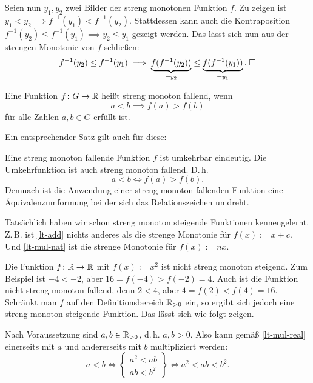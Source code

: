 Seien nun $y_1,y_2$ zwei Bilder der streng monotonen Funktion $f$.
Zu zeigen ist $y_1<y_2\implies f^{-1}(y_1)<f^{-1}(y_2)$.
Stattdessen kann auch die Kontraposition
$f^{-1}(y_2)\le f^{-1}(y_1)\implies y_2\le y_1$ gezeigt werden.
Das lässt sich nun aus der strengen Monotonie von $f$ schließen:
\begin{equation}
f^{-1}(y_2)\le f^{-1}(y_1)\implies
\underbrace{f(f^{-1}(y_2))}_{=y_2}\le \underbrace{f(f^{-1}(y_1))}_{=y_1}.\;\Box
\end{equation}

\begin{Definition}
Eine Funktion $f\colon G\to\mathbb R$ heißt streng monoton fallend, wenn
\[a<b\implies f(a)>f(b)\]
für alle Zahlen $a,b\in G$ erfüllt ist.
\end{Definition}

\noindent
Ein entsprechender Satz gilt auch für diese:
\begin{Satz}
Eine streng monoton fallende Funktion $f$ ist umkehrbar eindeutig.
Die Umkehrfunktion ist auch streng monoton fallend. D.\,h.
\[a<b\iff f(a)>f(b).\]
Demnach ist die Anwendung einer streng monoton fallenden
Funktion eine Äquivalenzumformung bei der sich das Relationszeichen
umdreht.
\end{Satz}

\noindent
Tatsächlich haben wir schon streng monoton steigende Funktionen
kennengelernt. Z.\,B. ist \eqref{lt-add} nichts anderes als die strenge
Monotonie für $f(x):=x+c$. Und \eqref{lt-mul-nat} ist die strenge
Monotonie für $f(x):=nx$.

Die Funktion $f\colon\mathbb R\to\mathbb R$ mit $f(x):=x^2$ ist nicht streng monoton
steigend. Zum Beispiel ist $-4<-2$, aber $16=f(-4)>f(-2)=4$. Auch
ist die Funktion nicht streng monoton fallend, denn $2<4$,
aber $4=f(2)<f(4)=16$. Schränkt man $f$
auf den Definitionsbereich $\mathbb R_{>0}$ ein, so ergibt sich jedoch eine
streng monoton steigende Funktion. Das lässt sich wie folgt zeigen.

Nach Voraussetzung sind $a,b\in\mathbb R_{>0}$, d.\,h. $a,b>0$.
Also kann gemäß \eqref{lt-mul-real} einerseits mit $a$
und andererseits mit $b$ multipliziert werden:
\[
a<b\iff\begin{Bmatrix}
a^2<ab\\
ab<b^2
\end{Bmatrix}
\iff a^2<ab<b^2.
\]




